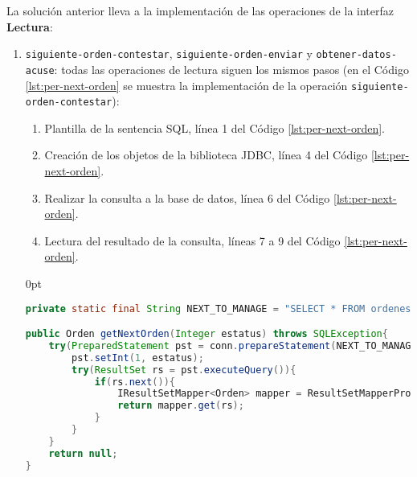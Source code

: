 La solución anterior lleva a la implementación de las operaciones de la interfaz \textbf{Lectura}:
\begin{enumerate}
	\item \texttt{siguiente-orden-contestar}, \texttt{siguiente-orden-enviar} y \texttt{obtener-datos-acuse}: todas las operaciones de lectura siguen los mismos pasos (en el Código \ref{lst:per-next-orden} se muestra la implementación de la operación \texttt{siguiente-orden-contestar}):
	\begin{enumerate}
		\item Plantilla de la sentencia SQL, línea 1 del Código \ref{lst:per-next-orden}.
		\item Creación de los objetos de la biblioteca JDBC, línea 4 del Código \ref{lst:per-next-orden}.
		\item Realizar la consulta a la base de datos, línea 6 del Código \ref{lst:per-next-orden}.
		\item Lectura del resultado de la consulta, líneas 7 a 9 del Código \ref{lst:per-next-orden}.
	\end{enumerate}

\pagebreak

	\begin{adjustwidth}{\listingfixwidth}{0pt}
	\begin{lstlisting}[language=Java, caption={Lectura de una orden de reposición desde la base de datos.}, captionpos=b, label={lst:per-next-orden}]
private static final String NEXT_TO_MANAGE = "SELECT * FROM ordenes WHERE estatus = ? ORDER BY fecha_insersion LIMIT 1";

public Orden getNextOrden(Integer estatus) throws SQLException{
	try(PreparedStatement pst = conn.prepareStatement(NEXT_TO_MANAGE)){
		pst.setInt(1, estatus);
		try(ResultSet rs = pst.executeQuery()){
    		if(rs.next()){
    			IResultSetMapper<Orden> mapper = ResultSetMapperProvider.getInstance().get(Orden.class);
    			return mapper.get(rs);
    		}
		}
	}
	return null;
}
	\end{lstlisting}
	\end{adjustwidth}
\end{enumerate}

